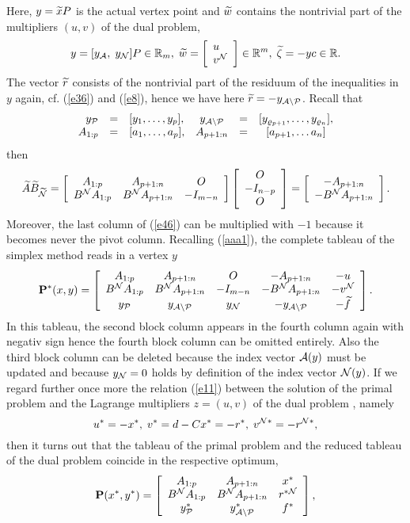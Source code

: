 %
Here, $y = \wi{x}P$ is the actual vertex point and $\wi{w}$
contains the nontrivial part of the multipliers $(u,v)$ of the dual problem,
\[
y = [y_{\A}, \; y_{\N}]P \in \Bbb{R}_m, \;
\wi{w} = \ba{[}{l}u \\v^{\N}\ea{]} \in \Bbb{R}^m, \;
\wi{\zeta} = - yc \in \Bbb{R}.
\]
The vector $\wi{r}$ consists of the nontrivial part of the residuum of the
inequalities in $y$ again, cf.  (\ref{e36}) and (\ref{e8}), hence we have
here $\wi{r} = - y_{\A \backslash \P}$. Recall that
\[ \ba{.}{rclcrcl}
y_{\P} &=& [y_1, \ldots, y_p], &
y_{\A \backslash \P} &=& [y_{\rho _{p+1}}, \ldots , y_{\rho _n}],\\
A_{1:p} &=& [a_1, \ldots, a_p], & A_{p+1:n} &=& [a_{p+1}, \ldots a_n]
\ea{.}
\]
then
\[
\wi{A}\wi{B}_{\wi{\N}} =
\ba{[}{ccc} A_{1:p} & A_{p+1:n} & O\\ B^{\N}A_{1:p} & B^{\N}A_{p+1:n} &
- I_{m-n} \ea{]}\ba{[}{c} O \\ - I_{n-p} \\ O \ea{]}
%
= \ba{[}{c}- A_{p+1:n} \\ - B^{\N}A_{p+1:n} \ea{]}.
\]
Moreover, the last column of (\ref{e46}) can be multiplied with $-1$ because it
becomes never the pivot column.  Recalling (\ref{aaa1}), the complete tableau
of the simplex method reads in a vertex $y$
%
\begin{equation} \label{e47}
{\bf P}^*(x,y)
=
\ba{[}{ccccc}
A_{1:p}       & A_{p+1:n}       & O           & -A_{p+1:n}            &
-u \\ B^{\N}A_{1:p} & B^{\N}A_{p+1:n} & - I_{m-n} & -B^{\N}A_{p+1:n}
&    -v^{\N}\\
y_{\P}  & y_{\A \backslash \P}    & y_{\N}      & -y_{\A \backslash \P}
&    -\wi{f} \ea{]}.
\end{equation}
In this tableau, the second block column appears in the fourth column again
with negativ sign hence the fourth block column can be omitted entirely.  Also
the third block column can be deleted because the index vector $\A(y)$ must
be updated and because $y_{\N} = 0$ holds by definition of the index vector
$\N(y)$.  If we regard further once more the relation (\ref{e11}) between the
solution
of the primal problem and the {\sc Lagrange} multipliers $z = (u,v)$ of the
dual problem , namely
\[
u^* = - x^*, \;  v^* = d - Cx^* = - r^*, \; v^{\N*} = - r^{\N*},
\]
then it turns out that the tableau of the primal problem and the reduced
tableau of the dual problem coincide in the respective optimum,
%
\begin{equation} \label{e48}
{\bf P}(x^*,y^*)
=
\ba{[}{ccc}
A_{1:p}       & A_{p+1:n}                  &   x^* \\
B^{\N}A_{1:p} & B^{\N}A_{p+1:n}            &   r^{*\N}\\
y^*_{\P}      & y^*_{\A \backslash \P}     &   f^*
\ea{]},
\end{equation}
